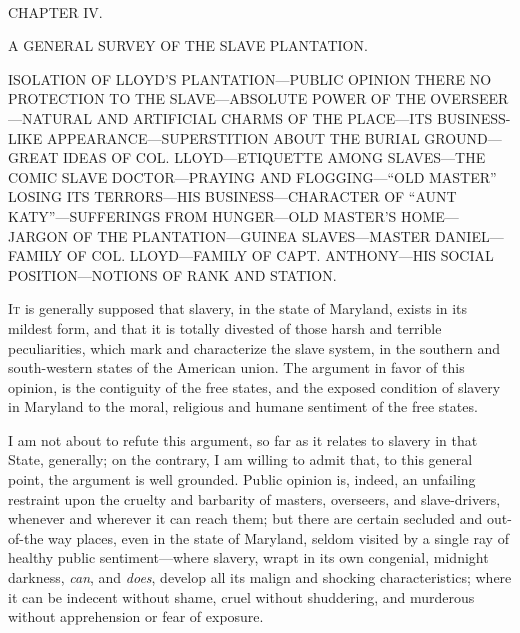 {}

~

{CHAPTER IV.}

A GENERAL SURVEY OF THE SLAVE PLANTATION.

{ISOLATION OF LLOYD'S PLANTATION---PUBLIC OPINION THERE NO PROTECTION TO
THE SLAVE---ABSOLUTE POWER OF THE OVERSEER---NATURAL AND ARTIFICIAL
CHARMS OF THE PLACE---ITS BUSINESS-LIKE APPEARANCE---SUPERSTITION ABOUT
THE BURIAL GROUND---GREAT IDEAS OF COL. LLOYD---ETIQUETTE AMONG
SLAVES---THE COMIC SLAVE DOCTOR---PRAYING AND FLOGGING---``OLD MASTER''
LOSING ITS TERRORS---HIS BUSINESS---CHARACTER OF ``AUNT
KATY''---SUFFERINGS FROM HUNGER---OLD MASTER'S HOME---JARGON OF THE
PLANTATION---GUINEA SLAVES---MASTER DANIEL---FAMILY OF COL.
LLOYD---FAMILY OF CAPT. ANTHONY---HIS SOCIAL POSITION---NOTIONS OF RANK
AND STATION.}

\textsc{It} is generally supposed that slavery, in the state of
Maryland, exists in its mildest form, and that it is totally divested of
those harsh and terrible peculiarities, which mark and characterize the
slave system, in the southern and south-western states of the American
union. The argument in favor of this opinion, is the contiguity of the
free states, and the exposed condition of slavery in Maryland to the
moral, religious and humane sentiment of the free states.

I am not about to refute this argument, so far as it relates to slavery
in that State, generally; on the contrary, I am willing to admit that,
to this general point, the argument is well grounded. Public opinion is,
indeed, an unfailing restraint upon the cruelty and barbarity of
masters, overseers, and slave-drivers, whenever and wherever it can
reach them; but there {}are certain secluded and out-of-the way places,
even in the state of Maryland, seldom visited by a single ray of healthy
public sentiment---where slavery, wrapt in its own congenial, midnight
darkness, \emph{can}, and \emph{does}, develop all its malign and
shocking characteristics; where it can be indecent without shame, cruel
without shuddering, and murderous without apprehension or fear of
exposure.

